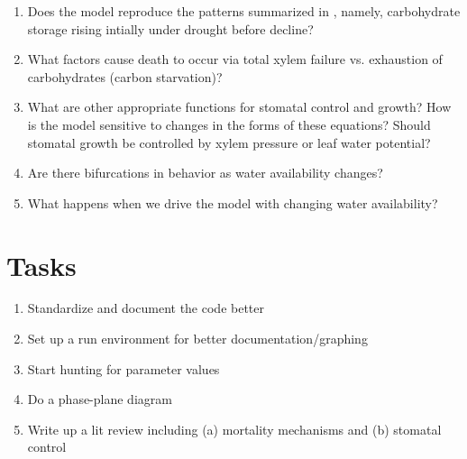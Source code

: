 \documentclass[12pt]{amsart}
\begin{document}
\begin{enumerate}
  \item Does the model reproduce the patterns summarized in \citet{McDowell2011}, namely, carbohydrate storage rising intially under drought before decline?
  \item What factors cause death to occur via total xylem failure vs. exhaustion of carbohydrates (carbon starvation)?
  \item What are other appropriate functions for stomatal control and growth?  How is the model sensitive to changes in the forms of these equations?  Should stomatal growth be controlled by xylem pressure or leaf water potential?
  \item Are there bifurcations in behavior as water availability changes?
  \item What happens when we drive the model with changing water availability?
\end{enumerate}
  
\section{Tasks}
\begin{enumerate}
  \item Standardize and document the code better
  \item Set up a run environment for better documentation/graphing
  \item Start hunting for parameter values
  \item Do a phase-plane diagram
  \item Write up a lit review including (a) mortality mechanisms and (b) stomatal control
\end{enumerate}



\end{document}
